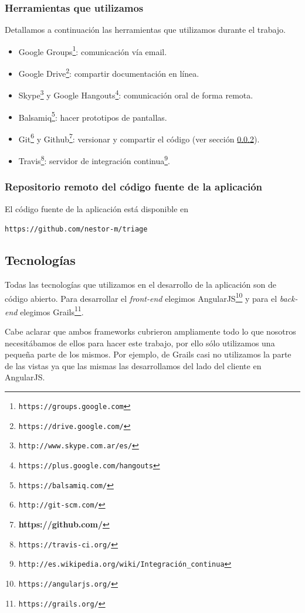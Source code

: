 \subsubsection{Herramientas que utilizamos}
Detallamos a continuación las herramientas que utilizamos durante el trabajo.
\begin{itemize}
\item Google Groups\footnote{\texttt{https://groups.google.com}}: comunicación vía email.
\item Google Drive\footnote{\texttt{https://drive.google.com/}}: compartir documentación en línea.
\item Skype\footnote{\texttt{http://www.skype.com.ar/es/}} y Google Hangouts\footnote{\texttt{https://plus.google.com/hangouts}}: comunicación oral de forma remota.
\item Balsamiq\footnote{\texttt{https://balsamiq.com/}}: hacer prototipos de pantallas.
\item Git\footnote{\texttt{http://git-scm.com/}} y Github\footnote{\textbf{https://github.com/}}: versionar y compartir el código (ver sección \ref{cap:repo}).
\item Travis\footnote{\texttt{https://travis-ci.org/}}: servidor de integración continua\footnote{\texttt{http://es.wikipedia.org/wiki/Integración\_continua}}.
\end{itemize}

\subsubsection{Repositorio remoto del código fuente de la aplicación}\label{cap:repo}
El código fuente de la aplicación está disponible en 
\begin{center}
\texttt{https://github.com/nestor-m/triage}
\end{center}

\subsection{Tecnologías}
Todas las tecnologías que utilizamos en el desarrollo de la aplicación son de código abierto. Para desarrollar el \textit{front-end} elegimos AngularJS\footnote{\texttt{https://angularjs.org/}} y para el \textit{back-end} elegimos Grails\footnote{\texttt{https://grails.org/}}.

Cabe aclarar que ambos frameworks cubrieron ampliamente todo lo que nosotros necesitábamos de ellos para hacer este trabajo, por ello sólo utilizamos una pequeña parte de los mismos. Por ejemplo, de Grails casi no utilizamos la parte de las vistas ya que las mismas las desarrollamos del lado del cliente en AngularJS.

